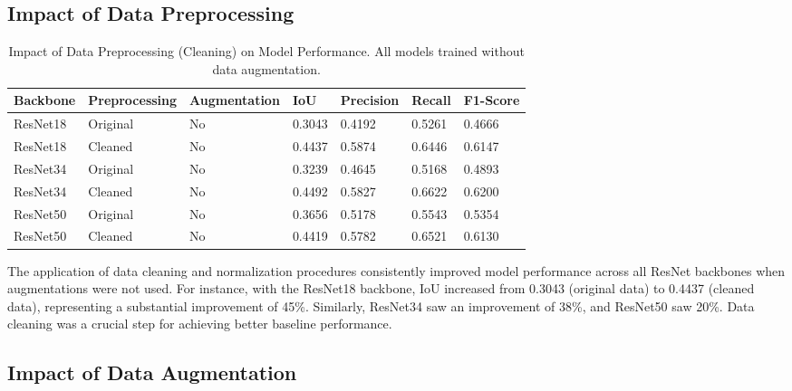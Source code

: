 \documentclass{article}
\begin{document}
\subsection{Impact of Data Preprocessing}

\begin{table}[htbp] %
  \caption{Impact of Data Preprocessing (Cleaning) on Model Performance. All models trained without data augmentation.}
  \label{table:preprocessing_impact}
  \centering
  \begin{tabular}{lllllll}
    \toprule
    Backbone & Preprocessing & Augmentation & IoU    & Precision & Recall & F1-Score \\
    \midrule
    ResNet18 & Original      & No           & 0.3043 & 0.4192    & 0.5261 & 0.4666   \\
    ResNet18 & Cleaned       & No           & 0.4437 & 0.5874    & 0.6446 & 0.6147   \\
    ResNet34 & Original      & No           & 0.3239 & 0.4645    & 0.5168 & 0.4893   \\
    ResNet34 & Cleaned       & No           & 0.4492 & 0.5827    & 0.6622 & 0.6200   \\
    ResNet50 & Original      & No           & 0.3656 & 0.5178    & 0.5543 & 0.5354   \\
    ResNet50 & Cleaned       & No           & 0.4419 & 0.5782    & 0.6521 & 0.6130   \\
    \bottomrule
  \end{tabular}
\end{table}

The application of data cleaning and normalization procedures consistently improved model performance across all ResNet backbones when augmentations were not used. For instance, with the ResNet18 backbone, IoU increased from 0.3043 (original data) to 0.4437 (cleaned data), representing a substantial improvement of 45\%. Similarly, ResNet34 saw an improvement of 38\%, and ResNet50 saw 20\%. Data cleaning was a crucial step for achieving better baseline performance.

\newpage

\subsection{Impact of Data Augmentation} 
\end{document}
